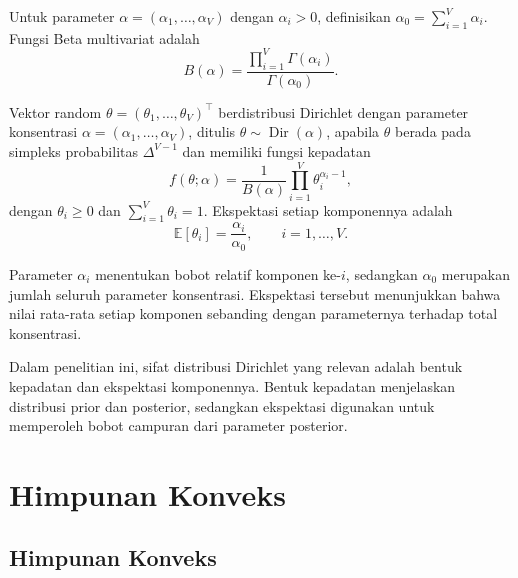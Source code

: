 \begin{definisi}
\label{def:betafungsimultivariat}
Untuk parameter $\alpha=(\alpha_1,\ldots,\alpha_V)$ dengan
$\alpha_i>0$, definisikan
$\alpha_0=\sum_{i=1}^{V}\alpha_i$. Fungsi Beta multivariat adalah
\begin{equation}
B(\alpha)=
\frac{\prod_{i=1}^{V}\Gamma(\alpha_i)}
{\Gamma(\alpha_0)}.
\label{eq:betafungsimultivariat}
\end{equation}
\end{definisi}

\begin{definisi}
\label{def:dirichlet}
Vektor random $\theta=(\theta_1,\ldots,\theta_V)^\top$
berdistribusi Dirichlet dengan parameter konsentrasi
$\alpha=(\alpha_1,\ldots,\alpha_V)$, ditulis
$\theta\sim\operatorname{Dir}(\alpha)$, apabila $\theta$ berada
pada simpleks probabilitas $\Delta^{V-1}$ dan memiliki fungsi
kepadatan
\begin{equation}
f(\theta;\alpha)=
\frac{1}{B(\alpha)}
\prod_{i=1}^{V}\theta_i^{\alpha_i-1},
\label{eq:dirichlet}
\end{equation}
dengan $\theta_i\geq 0$ dan $\sum_{i=1}^{V}\theta_i=1$.
Ekspektasi setiap komponennya adalah
\begin{equation}
\mathbb{E}[\theta_i]=\frac{\alpha_i}{\alpha_0},
\qquad i=1,\ldots,V.
\label{eq:ekspektasidirichlet}
\end{equation}
\end{definisi}

Parameter $\alpha_i$ menentukan bobot relatif komponen ke-$i$,
sedangkan $\alpha_0$ merupakan jumlah seluruh parameter konsentrasi.
Ekspektasi tersebut menunjukkan bahwa nilai rata-rata setiap komponen
sebanding dengan parameternya terhadap total konsentrasi.

Dalam penelitian ini, sifat distribusi Dirichlet yang relevan adalah
bentuk kepadatan dan ekspektasi komponennya. Bentuk kepadatan
menjelaskan distribusi prior dan posterior, sedangkan ekspektasi
digunakan untuk memperoleh bobot campuran dari parameter posterior.




\section{Himpunan Konveks}
\label{sec:himpunankonveks}

\subsection{Himpunan Konveks}
\label{subsec:himpunankonveks}

